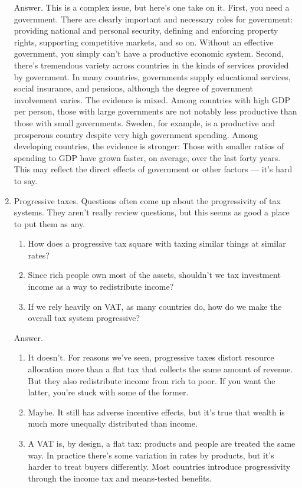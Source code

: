 \begin{enumerate}
Answer.  This is a complex issue, but here's one take on it.  First,
you need a government. There are clearly important and necessary
roles for government: providing national and personal security,
defining and enforcing property rights, supporting competitive
markets, and so on. Without an effective government, you simply
can't have a productive economic system. Second, there's tremendous
variety across countries in the kinds of services provided by
government.
In many countries, governments supply educational
services, social insurance, and pensions, although the degree of
government involvement varies. The evidence is mixed.  Among
countries with high GDP per person, those with large governments are
not notably less productive than those with small governments.
Sweden, for example, is a productive and prosperous country despite very high
government spending. Among developing countries, the evidence is
stronger: Those with smaller ratios of spending to GDP have grown faster,
on average, over the last forty years. This may reflect the direct
effects of government or other factors --- it's hard to say.

\item Progressive taxes.  Questions often come up about the progressivity
of tax systems.
They aren't really review questions, but this seems as good a place to put them
as any.
\begin{enumerate}
\item How does a progressive tax square with taxing similar things at similar rates?
\item Since rich people own most of the assets, shouldn't we tax investment income
as a way to redistribute income?
\item If we rely heavily on VAT, as many countries do,
 how do we make the overall tax system progressive?
\end{enumerate}

Answer.
\begin{enumerate}
\item It doesn't.
For reasons we've seen, progressive taxes distort resource allocation more than a flat tax that collects
the same amount of revenue.
But they also redistribute income from rich to poor.
If you want the latter, you're stuck with some of the former.
\item Maybe.  It still has adverse incentive effects, but it's true that
wealth is much more unequally distributed than income.
\item A VAT is, by design, a flat tax:  products and people are treated the same way.
In practice there's some variation in rates by products, but it's harder to
treat buyers differently.
Most countries introduce progressivity through the income tax and means-tested benefits.
\end{enumerate}
\end{enumerate}
\setlength{\leftmargini}{\oldleftmargini}

